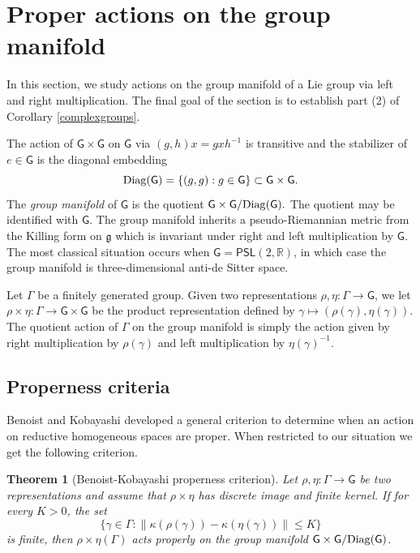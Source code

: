 \documentclass{amsart}
\theoremstyle{plain}
\newtheorem{theorem}[proposition]{Theorem}
\theoremstyle{definition}
\theoremstyle{remark}
\newcommand{\R}{\mathbb R}
\newcommand{\PSL}{\mathsf{PSL}}
\renewcommand{\sf}[1]{{\mathsf{#1}}}
\newcommand{\<}{\left <}
\renewcommand{\>}{\right >}
\newcommand{\G}{\Gamma}
\newcommand{\g}{\gamma}
\begin{document}
\section{Proper actions on the group manifold}

In this section, we study actions on the group manifold  of a Lie group via left and right multiplication. The final goal of the
section is to establish part (2) of Corollary \ref{complexgroups}.

The action of $\sf G\times\sf G$  on $\sf G$ via $(g,h)x=gxh^{-1}$ is transitive and the stabilizer of $e\in\sf G$ is the diagonal embedding 
$${\rm{Diag}}(\sf G)=\{(g,g):g\in\sf G\}\subset\sf G\times\sf G.$$ 
The {\em group manifold} of $\sf G$ is the quotient  $\sf G\times\sf G/\rm{Diag}(\sf G).$
The quotient may be identified with $\sf G$. 
The group manifold inherits a pseudo-Riemannian metric from the Killing form on $\mathfrak g$ which is invariant under right
and left multiplication by $\sf G$.
The most classical situation occurs when $\sf G=\PSL(2,\R)$, in which case
the group manifold is three-dimensional anti-de Sitter space.


Let $\Gamma$ be a finitely generated group. Given two representations $\rho,\eta:\G\to\sf G$, we let $\rho\times\eta:\G\to\sf G\times\sf G$ 
be the product representation  defined by $\g\mapsto(\rho(\g),\eta(\g)).$ The quotient action  of $\Gamma$ on the group manifold
is simply the action  given by right multiplication by $\rho(\g)$ and left multiplication by $\eta(\g)^{-1}$.


\subsection{Properness criteria}
Benoist\cite{BenoistK-criterion} and Kobayashi \cite{BKobayashi-criterion} developed a general criterion to determine when an action
on reductive homogeneous spaces are proper. When restricted to our situation we get the following criterion. 


\begin{theorem}[{Benoist-Kobayashi properness criterion}]
\label{BK}
Let $\rho,\eta:\G\to\sf G$ be two representations and assume that $\rho\times\eta$ has discrete image and finite kernel. 
If for every $K>0$, the set 
$$\big\{\g\in\G:\|\kappa(\rho(\g))-\kappa(\eta(\g))\|\leq K\big\}$$ 
is finite, then $\rho\times\eta(\G)$ acts properly on the group manifold $\sf G\times\sf G/\rm{Diag}(\sf G)$.
\end{theorem}
\end{document}
